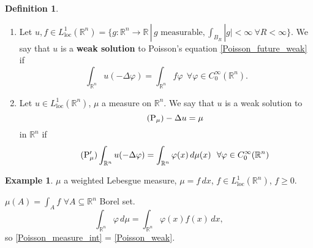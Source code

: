 \documentclass[12pt]{article}
\theoremstyle{definition}
\newtheorem*{definition*}{Definition}
\newtheorem{example}{Example}
\begin{document}
\begin{definition*}
\begin{enumerate}[label=\alph*)]
\item Let $u,f\in L_{\text{loc}}^1(\mathbb{R}^n)=\{g:\mathbb{R}^n\rightarrow\mathbb{R}\,|\,g\text{ measurable},\int_{B_R}|g|<\infty\ \forall R<\infty\}$. We say that $u$ is a \textbf{weak solution} to Poisson's equation \eqref{Poisson_future_weak} if
\begin{equation}\tag{P$'$}\label{Poisson_weak}
\int_{\mathbb{R}^n}u(-\Delta\varphi)=\int_{\mathbb{R}^n}f\varphi\ \ \forall\varphi\in C_0^{\infty}(\mathbb{R}^n).
\end{equation}

\item Let $u\in L_{\text{loc}}^1(\mathbb{R}^n)$, $\mu$ a measure on $\mathbb{R}^n$. We say that $u$ is a weak solution to
\begin{equation}\tag{P$_{\mu}$}\label{Poisson_measure}
-\Delta u=\mu
\end{equation}
in $\mathbb{R}^n$ if
\begin{equation}\tag{P$_{\mu}'$}\label{Poisson_measure_int}
\int_{\mathbb{R}^n}u(-\Delta\varphi)=\int_{\mathbb{R}^n}\varphi(x)\,d\mu(x)\ \ \forall\varphi\in C_0^{\infty}(\mathbb{R}^n)
\end{equation}
\end{enumerate}
\end{definition*}

\begin{example}
$\mu$ a weighted Lebesgue measure, $\mu=f\,dx$, $f\in L_{\text{loc}}^1(\mathbb{R}^n)$, $f\geq0$.

$\mu(A)=\int_Af$ $\forall A\subseteq\mathbb{R}^n$ Borel set.
\[\int_{\mathbb{R}^n}\varphi\,d\mu=\int_{\mathbb{R}^n}\varphi(x)f(x)\,dx,\]
so \eqref{Poisson_measure_int} = \eqref{Poisson_weak}.
\end{example}
\end{document}
